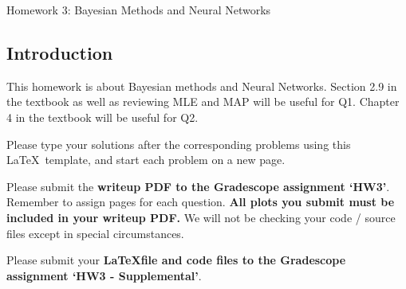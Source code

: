 \documentclass[submit]{harvardml}
\begin{document}
\begin{center}
{\Large Homework 3: Bayesian Methods and Neural Networks}\\
\end{center}

\subsection*{Introduction}

This homework is about Bayesian methods and Neural Networks.  Section 2.9 in the textbook as well as reviewing MLE and MAP will be useful for Q1. Chapter 4 in the textbook will be useful for Q2.

Please type your solutions after the corresponding problems using this
\LaTeX\ template, and start each problem on a new page.

Please submit the \textbf{writeup PDF to the Gradescope assignment `HW3'}. Remember to assign pages for each question.  \textbf{All plots you submit must be included in your writeup PDF.  }We will not be checking your code / source files except in special circumstances. 

Please submit your \textbf{\LaTeX file and code files to the Gradescope assignment `HW3 - Supplemental'}. 
\end{document}
